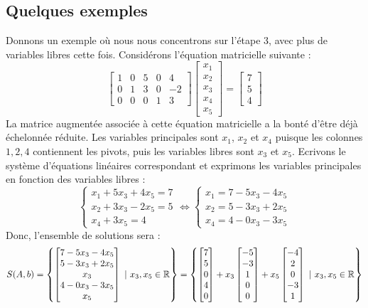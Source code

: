 \subsection{Quelques exemples}
\noindent Donnons un exemple où nous nous concentrons sur l'étape 3, avec plus de variables libres cette fois. Considérons l'équation matricielle suivante :
$$
\begin{bmatrix}
1 & 0 & 5 & 0 & 4\\
0 & 1 & 3 & 0 & -2\\
0 & 0 & 0 & 1 & 3
\end{bmatrix}
\begin{bmatrix}
x_1 \\x_2 \\ x_3 \\ x_4 \\ x_5
\end{bmatrix}
=
\begin{bmatrix}
7 \\ 5\\ 4
\end{bmatrix}
$$
La matrice augmentée associée à cette équation matricielle a la bonté d'être déjà échelonnée réduite. Les variables principales sont $x_1$, $x_2$ et $x_4$ puisque les colonnes $1, 2, 4$ contiennent les pivots, puis les variables libres sont $x_3$ et $x_5$. Ecrivons le système d'équations linéaires correspondant et exprimons les variables principales en fonction des variables libres :
$$
\begin{cases}
x_1 + 5x_3 + 4x_5 = 7\\
x_2 + 3x_3 -2x_5 = 5\\
x_4 + 3x_5 = 4
\end{cases}
\iff 
\begin{cases}
x_1 = 7 - 5x_3 -4x_5\\
x_2 = 5 - 3x_3 + 2x_5\\
x_4 = 4 - 0x_3 - 3x_5
\end{cases}
$$
Donc, l'ensemble de solutions sera :
$$
S(A,b) = \left\{
\begin{bmatrix}
7 - 5x_3 -4x_5\\
5 - 3x_3 + 2x_5\\
x_3\\
4 - 0x_3 - 3x_5\\
x_5
\end{bmatrix} \ | \ x_3, x_5 \in \mathbb{R}
\right\} = \left\{
\begin{bmatrix}
7 \\
5 \\
0\\
4\\
0
\end{bmatrix} + x_3\begin{bmatrix}
-5\\
-3\\
1\\
0\\
0
\end{bmatrix} + x_5\begin{bmatrix}
-4\\
2\\
0\\
-3\\
1
\end{bmatrix} \ | \ x_3, x_5 \in \mathbb{R}
\right\}
$$
